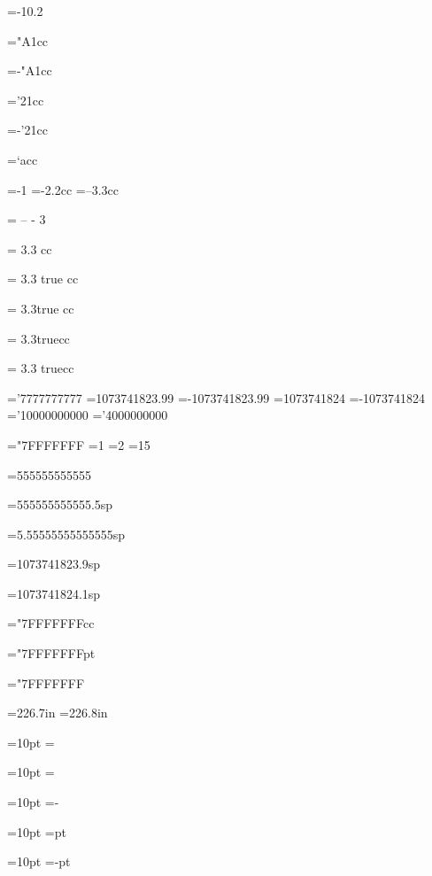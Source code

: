 =-10.2
\showthe{}

="A1cc
\showthe{}

=-"A1cc
\showthe{}

='21cc
\showthe{}

=-'21cc
\showthe{}

=`acc
\showthe{}

=-1
\showthe{}
=-2.2cc
\showthe{}
=--3.3cc
\showthe{}

  =  -- - 3  
\showthe{}

 = 3.3  cc
\showthe{}

 = 3.3 true cc
\showthe{}

 = 3.3true cc
\showthe{}

 = 3.3truecc
\showthe{}

 = 3.3 truecc
\showthe{}

='7777777777
\showthe{}
=1073741823.99
\showthe{}
=-1073741823.99
\showthe{}
=1073741824
\showthe{}
=-1073741824
\showthe{}
='10000000000
\showthe{}
='4000000000
\showthe{}

="7FFFFFFF
=1
\showthe{}
=2
\showthe{}
=15
\showthe{}

=555555555555
\showthe{}

=555555555555.5sp
\showthe{}

=5.55555555555555sp
\showthe{}

=1073741823.9sp
\showthe{}

=1073741824.1sp
\showthe{}

="7FFFFFFFcc
\showthe{}

="7FFFFFFFpt
\showthe{}

="7FFFFFFF
\showthe{}

=226.7in
\showthe{}
=226.8in
\showthe{}

=10pt
=\relax\relax
\showthe{}

=10pt
=\relax
\showthe{}

=10pt
=-\relax
\showthe{}

=10pt
=pt
\showthe{}

=10pt
=-pt
\showthe{}










